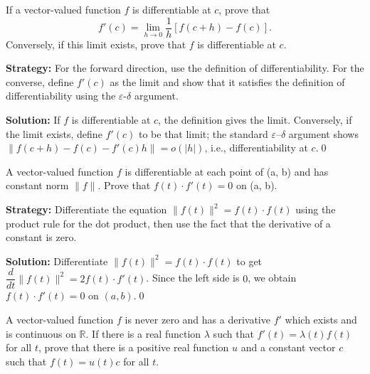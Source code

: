 \begin{problembox}
\begin{problemstatement}
If a vector-valued function \( f \) is differentiable at \( c \), prove that
\[ f'(c) = \lim_{h \to 0} \frac{1}{h} [f(c + h) - f(c)]. \]
Conversely, if this limit exists, prove that \( f \) is differentiable at \( c \).
\end{problemstatement}
\end{problembox}

\noindent\textbf{Strategy:} For the forward direction, use the definition of differentiability. For the converse, define \( f'(c) \) as the limit and show that it satisfies the definition of differentiability using the \( \varepsilon \)-\( \delta \) argument.

\bigskip\noindent\textbf{Solution:}
If $f$ is differentiable at $c$, the definition gives the limit. Conversely, if the limit exists, define $f'(c)$ to be that limit; the standard $\varepsilon$–$\delta$ argument shows $\|f(c+h)-f(c)-f'(c)h\|=o(|h|)$, i.e., differentiability at $c$.\qed


\begin{problembox}
\begin{problemstatement}
A vector-valued function \( f \) is differentiable at each point of (a, b) and has constant norm \( \|f\| \). Prove that \( f(t) \cdot f'(t) = 0 \) on (a, b).
\end{problemstatement}
\end{problembox}

\noindent\textbf{Strategy:} Differentiate the equation \( \|f(t)\|^2 = f(t) \cdot f(t) \) using the product rule for the dot product, then use the fact that the derivative of a constant is zero.

\bigskip\noindent\textbf{Solution:}
Differentiate $\|f(t)\|^2=f(t)\cdot f(t)$ to get $\dfrac{d}{dt}\|f(t)\|^2=2 f(t)\cdot f'(t)$. Since the left side is $0$, we obtain $f(t)\cdot f'(t)=0$ on $(a,b)$.\qed


\begin{problembox}
\begin{problemstatement}
A vector-valued function \( f \) is never zero and has a derivative \( f' \) which exists and is continuous on \( \mathbb{R} \). If there is a real function \( \lambda \) such that \( f'(t) = \lambda(t)f(t) \) for all \( t \), prove that there is a positive real function \( u \) and a constant vector \( c \) such that \( f(t) = u(t)c \) for all \( t \).
\end{problemstatement}
\end{problembox}


